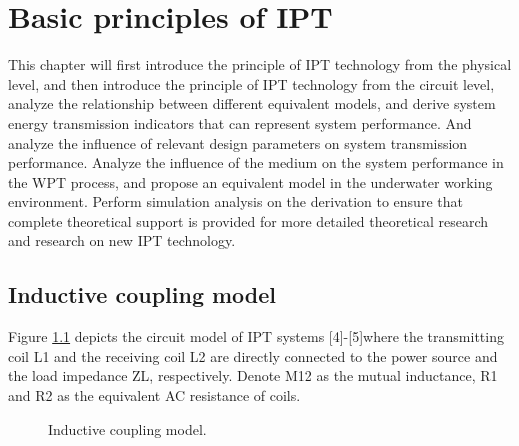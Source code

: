 \chapter{Basic principles of IPT}
This chapter will first introduce the principle of IPT technology from the physical level, and then introduce the principle of IPT technology from the circuit level, analyze the relationship between different equivalent models, and derive system energy transmission indicators that can represent system performance. And analyze the influence of relevant design parameters on system transmission performance. Analyze the influence of the medium on the system performance in the WPT process, and propose an equivalent model in the underwater working environment. Perform simulation analysis on the derivation to ensure that complete theoretical support is provided for more detailed theoretical research and research on new IPT technology.
\section{Inductive coupling model}
Figure \ref{WPT} depicts the circuit model of IPT systems [4]-[5]where the transmitting coil L1 and the receiving coil L2 are
directly connected to the power source and the load impedance
ZL, respectively. Denote M12 as the mutual inductance, R1 and
R2 as the equivalent AC resistance of coils.

\begin{figure}
    \centering
    \caption{Inductive coupling model.}
    \label{WPT}
\end{figure}

